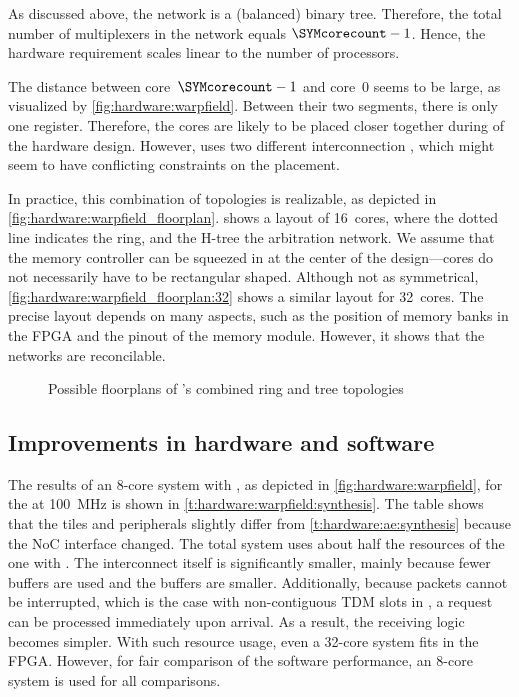 As discussed above, the network is a (balanced) binary tree.
Therefore, the total number of multiplexers in the network equals $\SYMcorecount-1$.
Hence, the hardware requirement scales linear to the number of processors.

The distance between core~$\SYMcorecount-1$ and core~$0$ seems to be large, as visualized by \cref{fig:hardware:warpfield}.
Between their two  segments, there is only one register.
Therefore, the cores are likely to be placed closer together during  of the hardware design.
However, \Warpfield uses two different interconnection , which might seem to have conflicting constraints on the placement.

In practice, this combination of topologies is realizable, as depicted in \vref{fig:hardware:warpfield_floorplan}.
 shows a  layout of 16~cores, where the dotted line indicates the ring, and the H-tree the arbitration network.
We assume that the memory controller can be squeezed in at the center of the design---cores do not necessarily have to be rectangular shaped.
Although not as symmetrical, \cref{fig:hardware:warpfield_floorplan:32} shows a similar layout for 32~cores.
The precise layout depends on many aspects, such as the position of memory banks in the \ac{FPGA} and the pinout of the memory module.
However, it shows that the networks are reconcilable.

\begin{figure}%
%
\caption{Possible  floorplans of \Warpfield's combined ring and tree topologies}%
\label{fig:hardware:warpfield_floorplan}%
\end{figure}

\subsection{Improvements in hardware and software}
\label{s:hardware:warpfield:synthesis}

The  results of an 8-core system with \Warpfield*, as depicted in \vref{fig:hardware:warpfield}, for the \ourVirtex at \SI{100}{\mega\hertz} is shown in \vref{t:hardware:warpfield:synthesis}.
The table shows that the \MicroBlaze tiles and peripherals slightly differ from \vref{t:hardware:ae:synthesis} because the \ac{NoC} interface changed.
The total system uses about half the resources of the one with \aethereal.
The interconnect itself is significantly smaller, mainly because fewer buffers are used and the buffers are smaller.
Additionally, because packets cannot be interrupted, which is the case with non-contiguous \ac{TDM} slots in \aethereal, a request can be processed immediately upon arrival.
As a result, the receiving logic becomes simpler.
With such resource usage, even a 32-core system fits in the \ac{FPGA}. %
However, for fair comparison of the software performance, an 8-core system is used for all comparisons.

